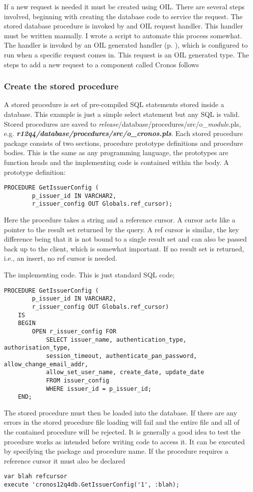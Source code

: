 \documentclass[a4paper, 11pt, titlepage]{article}
\begin{document}
If a new request is needed it must be created using OIL. There are several steps involved, beginning with creating the database code to service the request. The stored database procedure is invoked by and OIL request handler. This handler must be written manually. I wrote a script to automate this process somewhat. The handler is invoked by an OIL generated handler (p. \pageref{handlerset}), which is configured to run when a specific request comes in. This request is an OIL generated type. The steps to add a new request to a component called Cronos follows 
\subsubsection{Create the stored procedure} 
A stored procedure is set of pre-compiled SQL statements stored inside a database. This example is just a simple select statement but any SQL is valid. Stored procedures are saved to \textit{release}/database/procedures/src/o\_\textit{module}.pls, e.g. \textbf{\textit{r12q4/database/procedures/src/o\_cronos.pls}}. Each stored procedure package consists of two sections, procedure prototype definitions and procedure bodies. This is the same as any programming language, the prototypes are function heads and the implementing code is contained within the body. 
A prototype definition: 
\begin{verbatim} 
PROCEDURE GetIssuerConfig ( 
        p_issuer_id IN VARCHAR2, 
        r_issuer_config OUT Globals.ref_cursor); 
\end{verbatim} 
Here the procedure takes a string and a reference cursor. A cursor acts like a pointer to the result set returned by the query. A ref cursor is similar, the key difference being that it is not bound to a single result set and can also be passed back up to the client, which is somewhat important. If no result set is returned, i.e., an insert, no ref cursor is needed. 

The implementing code. This is just standard SQL code;
\begin{verbatim} 
PROCEDURE GetIssuerConfig ( 
        p_issuer_id IN VARCHAR2, 
        r_issuer_config OUT Globals.ref_cursor) 
    IS 
    BEGIN 
        OPEN r_issuer_config FOR 
            SELECT issuer_name, authentication_type, authorisation_type, 
            session_timeout, authenticate_pan_password, allow_change_email_addr, 
            allow_set_user_name, create_date, update_date 
            FROM issuer_config 
            WHERE issuer_id = p_issuer_id; 
    END; 
\end{verbatim} 
The stored procedure must then be loaded into the database. If there are any errors in the stored procedure file loading will fail and the entire file and all of the contained procedure will be rejected. It is generally a good idea to test the procedure works as intended before writing code to access it. It can be executed by specifying the package and procedure name. If the procedure requires a reference cursor it must also be declared 
\begin{verbatim} 
var blah refcursor 
execute 'cronos12q4db.GetIssuerConfig('1', :blah); 
\end{verbatim} 
 
\end{document}
